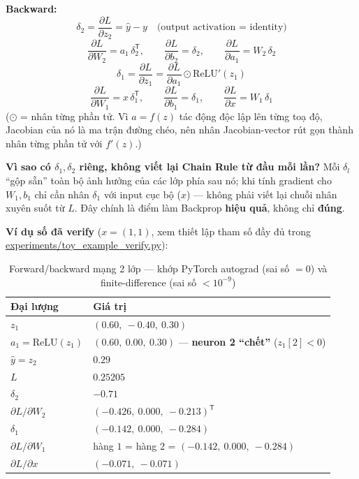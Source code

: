 \documentclass[12pt,a4paper]{article}
\newcommand{\T}{^{\mathsf{T}}}
\begin{document}
\textbf{Backward:}
$$\delta_2=\frac{\partial L}{\partial z_2}=\hat y-y \quad\text{(output activation = identity)}$$
$$\frac{\partial L}{\partial W_2}=a_1\,\delta_2\T,\qquad
\frac{\partial L}{\partial b_2}=\delta_2,\qquad
\frac{\partial L}{\partial a_1}=W_2\,\delta_2$$
$$\delta_1=\frac{\partial L}{\partial z_1}=\frac{\partial L}{\partial a_1}\odot \mathrm{ReLU}'(z_1)$$
$$\frac{\partial L}{\partial W_1}=x\,\delta_1\T,\qquad
\frac{\partial L}{\partial b_1}=\delta_1,\qquad
\frac{\partial L}{\partial x}=W_1\,\delta_1$$
($\odot$ = nhân từng phần tử. Vì $a=f(z)$ tác động độc lập lên từng toạ độ,
Jacobian của nó là ma trận đường chéo, nên nhân Jacobian-vector rút gọn
thành nhân từng phần tử với $f'(z)$.)

\textbf{Vì sao có $\delta_1,\delta_2$ riêng, không viết lại Chain Rule từ
đầu mỗi lần?} Mỗi $\delta_l$ ``gộp sẵn'' toàn bộ ảnh hưởng của các lớp phía
sau nó; khi tính gradient cho $W_1,b_1$ chỉ cần nhân $\delta_1$ với input
cục bộ ($x$) --- không phải viết lại chuỗi nhân xuyên suốt từ $L$. Đây
chính là điểm làm Backprop \textbf{hiệu quả}, không chỉ \textbf{đúng}.

\textbf{Ví dụ số đã verify} ($x=(1,1)$, xem thiết lập tham số đầy đủ trong
\url{experiments/toy_example_verify.py}):

\begin{table}[H]
\centering
\caption{Forward/backward mạng 2 lớp --- khớp PyTorch autograd (sai số $=0$)
và finite-difference (sai số $<10^{-9}$)}
\begin{tabular}{@{}ll@{}}
\toprule
\textbf{Đại lượng} & \textbf{Giá trị} \\
\midrule
$z_1$ & $(0.60,\ -0.40,\ 0.30)$ \\
$a_1=\mathrm{ReLU}(z_1)$ & $(0.60,\ 0.00,\ 0.30)$ --- \textbf{neuron 2 ``chết''} ($z_1[2]<0$) \\
$\hat y = z_2$ & $0.29$ \\
$L$ & $0.25205$ \\
$\delta_2$ & $-0.71$ \\
$\partial L/\partial W_2$ & $(-0.426,\ 0.000,\ -0.213)\T$ \\
$\delta_1$ & $(-0.142,\ 0.000,\ -0.284)$ \\
$\partial L/\partial W_1$ & hàng $1$ = hàng $2$ = $(-0.142,\ 0.000,\ -0.284)$ \\
$\partial L/\partial x$ & $(-0.071,\ -0.071)$ \\
\bottomrule
\end{tabular}
\label{tab:2layer_numeric}
\end{table}
\end{document}
